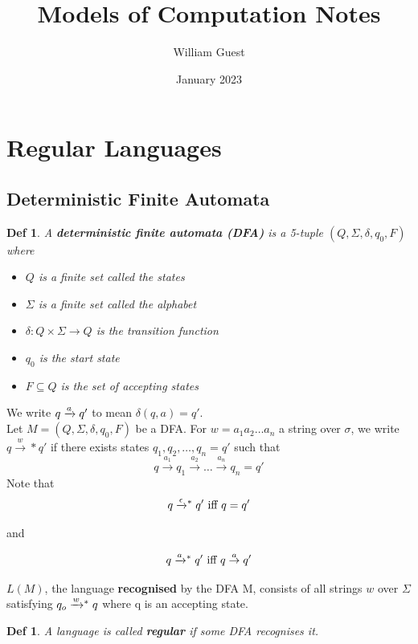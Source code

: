 \documentclass{article}
\title{Models of Computation Notes}
\author{William Guest}
\date{January 2023}
\newtheorem{defn}[dummy]{Def}
\newcommand{\xto}[1]{ \overset{#1}{\to} }
\newcommand{\Enum}[2]{ #1_1, #1_2, \ldots, #1_#2 }
\newcommand{\Trans}[3]{ #1 \xrightarrow{ #2 }\mathrel{\vphantom{\to}} #3 }
\newcommand{\Translong}[3]{ #1 \xrightarrow{ #2 }\mathrel{\vphantom{\to}^*} #3 }
\begin{document}
\maketitle

\section{Regular Languages}

    \subsection{Deterministic Finite Automata}

    \begin{defn}

        A \textbf{deterministic finite automata (DFA)}  is a 5-tuple $(Q, \Sigma, \delta, q_0, F)$ where
        \begin{itemize}
            \item $Q$ is a finite set called the states
            \item $\Sigma$ is a finite set called the alphabet
            \item $\delta : Q \times \Sigma \to Q$ is the transition function
            \item $q_0$ is the start state
            \item $F \subseteq Q$ is the set of accepting states
        \end{itemize}
    
    \end{defn}

    We write $\Trans{q}{a}{q'}$ to mean $\delta(q,a) = q'$. \\
    
    Let $M = (Q, \Sigma, \delta, q_0, F)$ be a DFA. For $w = a_1a_2 \ldots a_n$ a string over $\sigma$, we write $q \xto{w}* q'$ if there exists states $\Enum{q}{n} = q'$ such that
    \[ q \xto{a_1} q_1 \xto{a_2} \ldots \xto{a_n} q_n = q' \]
    Note that 
    \[ \Translong{q}{\epsilon}{q'} \text{ iff } q = q' \]

    and

    \[ \Translong{q}{a}{q'} \text{ iff } q \xto{a} q' \]

    $L(M)$, the language \textbf{recognised} by the DFA M, consists of all strings $w$ over $\Sigma$ satisfying $\Translong{q_o}{w}{q}$ where q is an accepting state. 

    \begin{defn}
        A language is called \textbf{regular} if some DFA recognises it. 
    \end{defn}
\end{document}
